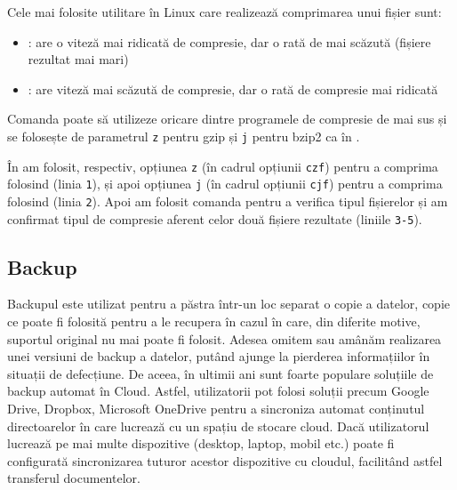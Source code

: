 Cele mai folosite utilitare în Linux care realizează comprimarea unui fișier sunt:

\begin{itemize}
  \item {}: are o viteză mai ridicată de compresie, dar o rată de mai scăzută (fișiere rezultat mai mari)
  \item {}: are viteză mai scăzută de compresie, dar o rată de compresie mai ridicată
\end{itemize}

Comanda  poate să utilizeze oricare dintre programele de compresie de mai sus și se folosește de parametrul \texttt{z} pentru gzip și \texttt{j} pentru bzip2 ca în .


În  am folosit, respectiv, opțiunea \texttt{z} (în cadrul opțiunii \texttt{czf}) pentru a comprima folosind  (linia \texttt{1}), și apoi opțiunea \texttt{j} (în cadrul opțiunii \texttt{cjf}) pentru a comprima folosind  (linia \texttt{2}). Apoi am folosit comanda  pentru a verifica tipul fișierelor și am confirmat tipul de compresie aferent celor două fișiere rezultate (liniile \texttt{3-5}).

\subsection{Backup}
\label{sec:fs:backup}

Backupul este utilizat pentru a păstra într-un loc separat o copie a datelor, copie ce poate fi folosită pentru a le recupera în cazul în care, din diferite motive, suportul original nu mai poate fi folosit. Adesea omitem sau amânăm realizarea unei versiuni de backup a datelor, putând ajunge la pierderea informațiilor în situații de defecțiune. De aceea, în ultimii ani sunt foarte populare soluțiile de backup automat în Cloud. Astfel, utilizatorii pot folosi soluții precum Google Drive, Dropbox, Microsoft OneDrive pentru a sincroniza automat conținutul directoarelor în care lucrează cu un spațiu de stocare cloud. Dacă utilizatorul lucrează pe mai multe dispozitive (desktop, laptop, mobil etc.) poate fi configurată sincronizarea tuturor acestor dispozitive cu cloudul, facilitând astfel transferul documentelor.

